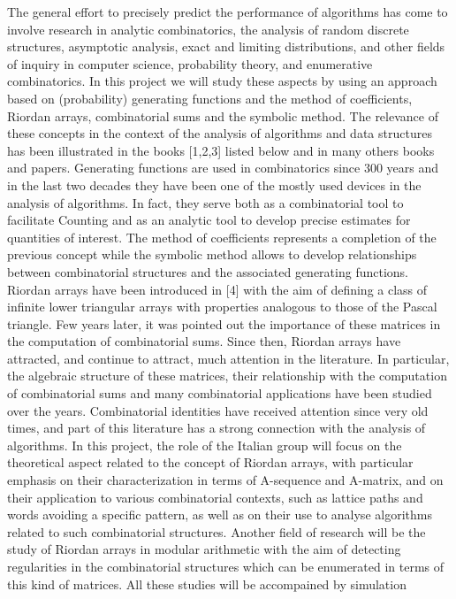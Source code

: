 The general effort to precisely predict the performance of algorithms
has come to involve research in analytic combinatorics, the analysis
of random discrete structures, asymptotic analysis, exact and limiting
distributions, and other fields of inquiry in computer science,
probability theory, and enumerative combinatorics. In this project we
will study these aspects by using an approach based on (probability)
generating functions and the method of coefficients, Riordan arrays,
combinatorial sums and the symbolic method. The relevance of these
concepts in the context of the analysis of algorithms and data
structures has been illustrated in the books [1,2,3] listed below and
in many others books and papers. Generating functions are used in
combinatorics since 300 years and in the last two decades they have
been one of the mostly used devices in the analysis of algorithms. In
fact, they serve both as a combinatorial tool to facilitate Counting
and as an analytic tool to develop precise estimates for quantities of
interest. The method of coefficients represents a completion of the
previous concept while the symbolic method allows to develop
relationships between combinatorial structures and the associated
generating functions. Riordan arrays have been introduced in [4] with
the aim of defining a class of infinite lower triangular arrays with
properties analogous to those of the Pascal triangle. Few years later,
it was pointed out the importance of these matrices in the computation
of combinatorial sums. Since then, Riordan arrays have attracted, and
continue to attract, much attention in the literature. In particular,
the algebraic structure of these matrices, their relationship with the
computation of combinatorial sums and many combinatorial applications
have been studied over the years. Combinatorial identities have
received attention since very old times, and part of this literature
has a strong connection with the analysis of algorithms. In this
project, the role of the Italian group will focus on the theoretical
aspect related to the concept of Riordan arrays, with particular
emphasis on their characterization in terms of A-sequence and
A-matrix, and on their application to various combinatorial contexts,
such as lattice paths and words avoiding a specific pattern, as well
as on their use to analyse algorithms related to such combinatorial
structures. Another field of research will be the study of Riordan
arrays in modular arithmetic with the aim of detecting regularities in
the combinatorial structures which can be enumerated in terms of this
kind of matrices. All these studies will be accompained by simulation
